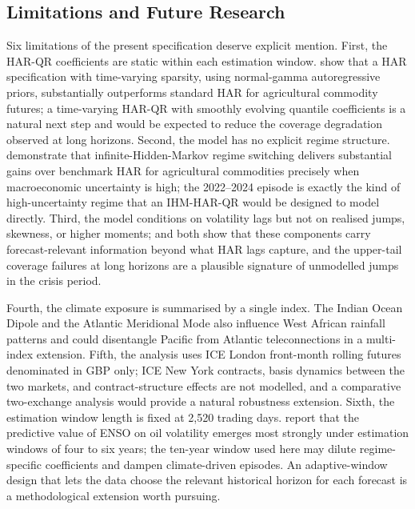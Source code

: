 \subsection{Limitations and Future Research}
\label{sec:disc-limitations}

Six limitations of the present specification deserve explicit mention.
First, the HAR-QR coefficients are static within each estimation window.
\textcite{gongRealizedVolatilityForecasting2017} show that a HAR
specification with time-varying sparsity, using normal-gamma autoregressive
priors, substantially outperforms standard HAR for agricultural commodity
futures; a time-varying HAR-QR with smoothly evolving quantile coefficients
is a natural next step and would be expected to reduce the coverage
degradation observed at long horizons. Second, the model has no explicit
regime structure. \textcite{luoForecastingRealizedVolatility2022}
demonstrate that infinite-Hidden-Markov regime switching delivers
substantial gains over benchmark HAR for agricultural commodities precisely
when macroeconomic uncertainty is high; the 2022--2024 episode is exactly
the kind of high-uncertainty regime that an IHM-HAR-QR would be designed to
model directly. Third, the model conditions on volatility lags but not on
realised jumps, skewness, or higher moments;
\textcite{andersen2007roughing} and \textcite{bonatoForecastingRealizedVolatility2024}
both show that these components carry forecast-relevant information beyond
what HAR lags capture, and the upper-tail coverage failures at long
horizons are a plausible signature of unmodelled jumps in the crisis
period.

Fourth, the climate exposure is summarised by a single index. The Indian
Ocean Dipole and the Atlantic Meridional Mode also influence West African
rainfall patterns and could disentangle Pacific from Atlantic
teleconnections in a multi-index extension. Fifth, the analysis uses ICE
London front-month rolling futures denominated in GBP only; ICE New York
contracts, basis dynamics between the two markets, and contract-structure
effects are not modelled, and a comparative two-exchange analysis would
provide a natural robustness extension. Sixth, the estimation window length
is fixed at 2{,}520 trading days. \textcite{bouriNinoForecastabilityOilprice2021}
report that the predictive value of ENSO on oil volatility emerges most
strongly under estimation windows of four to six years; the ten-year
window used here may dilute regime-specific coefficients and dampen
climate-driven episodes. An adaptive-window design that lets the data
choose the relevant historical horizon for each forecast is a methodological
extension worth pursuing.

